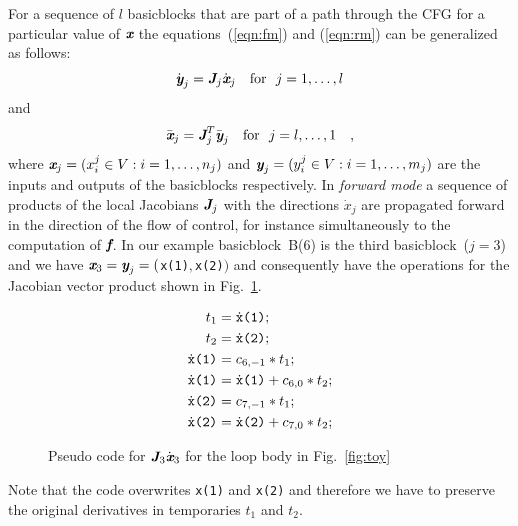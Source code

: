 \documentclass{book}
\newcommand{\basicblock}{basicblock}
\newcommand{\bmf}{\mbox{\bf\em f}}
\newcommand{\bmJ}{\mbox{\bf\em J}}
\newcommand{\bmx}{\mbox{\bf\em x}}
\newcommand{\bmy}{\mbox{\bf\em y}}
\newcommand{\reffig}[1]{{Fig.~\ref{#1}}}
\begin{document}
For a sequence of $l$ {\basicblock}s that are part of 
a path through the CFG for a particular value of $\bmx$ the 
equations~(\ref{eqn:fm}) and (\ref{eqn:rm}) can be generalized as follows:
\begin{equation} \label{eqn:bbfm}
  \dot{\bmy}_j=\bmJ_j \dot{\bmx}_j \quad \text{for}~~j=1,\ldots,l
\end{equation} 
and 
\begin{equation} \label{eqn:bbrm}
  \bar{\bmx}_j=\bmJ^T_j \bar{\bmy}_j \quad \text{for}~~j=l,\ldots,1\quad ,
\end{equation} 
where $\bmx_j = (x^j_i \in V :  i=1,\ldots,n_j)$ and
$\bmy_j = (y^j_i \in V : i=1,\ldots,m_j)$ are the inputs and outputs of the 
{\basicblock}s
respectively. 
In {\em forward mode} a sequence of 
products of the local Jacobians $\bmJ_j$ 
with the directions $\dot{x}_j$ 
are propagated forward in the direction of the flow of control, for 
instance simultaneously to the computation of $\bmf$.
In our example \basicblock\ B(6) is the third \basicblock\ ($j=3$) and we have
$\bmx_3=\bmy_j=($\lstinline{x(1)}$,$\lstinline{x(2)}$)$ and 
consequently have the operations for the Jacobian vector product shown 
in \reffig{fig:toyPreacc}.  
\begin{figure}[h]
  \begin{center}
    \begin{align*}
      t_1&=\dot{\tt x}\mbox{\tt (1)} ; \\
      t_2&=\dot{\tt x}\mbox{\tt (2)}; \\
      \dot{\tt x}\mbox{\tt (1)}&=c_{6,-1}*t_1; \\
      \dot{\tt x}\mbox{\tt (1)}&=\dot{\tt x}\mbox{\tt (1)}+c_{6,0}*t_2; \\
      \dot{\tt x}\mbox{\tt (2)}&=c_{7,-1}*t_1; \\
      \dot{\tt x}\mbox{\tt (2)}&=\dot{\tt x}\mbox{\tt (2)}+c_{7,0}*t_2; 
    \end{align*}
  \end{center}	
  \caption{Pseudo code for $\bmJ_3\dot{\bmx}_3$ for the loop body in \reffig{fig:toy}}\label{fig:toyPreacc}
\end{figure}
Note that the code overwrites \lstinline{x(1)} and \lstinline{x(2)} and therefore 
we have to preserve the original derivatives in temporaries $t_1$ and $t_2$.
\end{document}
